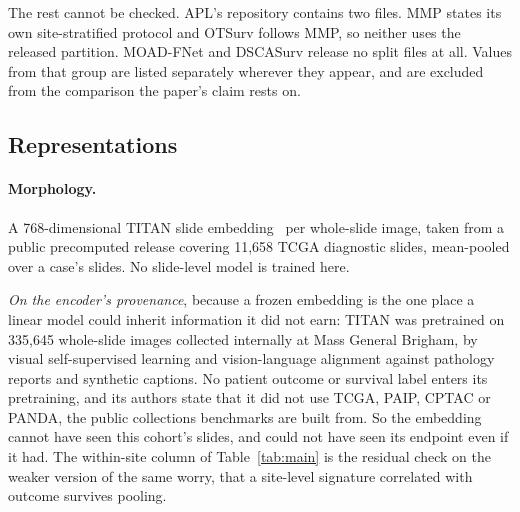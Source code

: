 \documentclass[unnumsec,webpdf,contemporary,large]{oup-authoring-template}
\begin{document}
The rest cannot be checked. APL's repository contains two files. MMP states its own site-stratified
protocol and OTSurv follows MMP, so neither uses the released partition. MOAD-FNet and DSCASurv
release no split files at all. Values from that group are listed separately wherever they
appear, and are excluded from the comparison the paper's claim rests on.

\subsection{Representations}

\paragraph{Morphology.} A 768-dimensional TITAN slide embedding~\citep{ding2025titan} per whole-slide
image, taken from a public precomputed release covering 11{,}658 TCGA diagnostic slides, mean-pooled
over a case's slides. No slide-level model is trained here.

\emph{On the encoder's provenance}, because a frozen embedding is the one place a linear model could
inherit information it did not earn: TITAN was pretrained on 335{,}645 whole-slide images collected
internally at Mass General Brigham, by visual self-supervised learning and vision-language alignment
against pathology reports and synthetic captions. No patient outcome or survival label
enters its pretraining, and its authors state that it did not use TCGA, PAIP, CPTAC or PANDA, the
public collections benchmarks are built from. So the embedding cannot have seen this cohort's
slides, and could not have seen its endpoint even if it had. The within-site column of
Table~\ref{tab:main} is the residual check on the weaker version of the same worry, that a
site-level signature correlated with outcome survives pooling.
\end{document}
